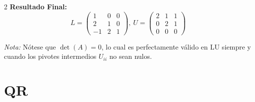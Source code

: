 \documentclass[10pt]{extarticle}
\begin{document}
\begin{multicols}{2}
\textbf{Resultado Final:}
$$L=\begin{pmatrix}1&0&0\\2&1&0\\-1&2&1\end{pmatrix},\ U=\begin{pmatrix}2&1&1\\0&2&1\\0&0&0\end{pmatrix}$$

\textit{Nota:} Nótese que $\det(A)=0$, lo cual es perfectamente válido en LU siempre y cuando los pivotes intermedios $U_{ii}$ no sean nulos.

\end{multicols}
\newpage
\section*{QR}
\end{document}
